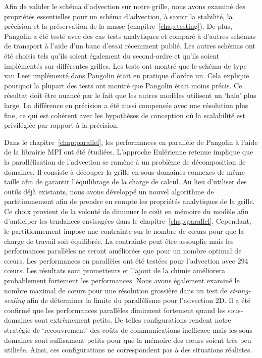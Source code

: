 Afin de valider le schéma d'advection sur notre grille, nous avons examiné des
propriétés essentielles pour un schéma d'advection, à savoir la stabilité, la
précision et la préservation de la masse (chapitre~\ref{chap:testing}). De plus,
Pangolin a été testé avec des cas tests analytiques et comparé à d'autres
schémas de transport à l'aide d'un banc d'essai récemment publié. Les autres
schémas ont été choisis tels qu'ils soient également du second-ordre et qu'ils
soient implémentés sur différentes grilles. Les tests ont montré que le schéma
de type van Leer implémenté dans Pangolin était en pratique d'ordre un. Cela
explique pourquoi la plupart des tests ont montré que Pangolin était moins
précis. Ce résultat doit être nuancé par le fait que les autres modèles
utilisent un `halo' plus large. La différence en précision a été aussi
compensée avec une résolution plus fine, ce qui est cohérent avec les
hypothèses de conception où la scalabilité est privilégiée par rapport à la
précision.

Dans le chapitre~\ref{chap:parallel}, les performances en parallèle de Pangolin
à l'aide de la librairie MPI ont été étudiées. L'approche Eulérienne retenue
implique que la parallélisation de l'advection se ramène à un problème de
décomposition de domaines. Il consiste à découper la grille en sous-domaines
connexes de même taille afin de garantir l'équilibrage de la charge de calcul.
Au lieu d'utiliser des outils déjà existants, nous avons développé un nouvel
algorithme de partitionnement afin de prendre en compte les propriétés
analytiques de la grille. Ce choix provient de la volonté de diminuer le coût en
mémoire du modèle afin d'anticiper les tendances envisagées dans le
chapitre~\ref{chap:parallel}. Cependant, le partitionnement impose une
contrainte sur le nombre de c\oe{}urs pour que la charge de travail soit
équilibrée. La contrainte peut être assouplie mais les performances parallèles
ne seront améliorées que pour un nombre optimal de c\oe{}urs. Les performances en
parallèles ont été testées pour l'advection avec 294 c\oe{}urs. Les résultats sont
prometteurs et l'ajout de la chimie améliorera probablement fortement les
performances. Nous avons également examiné le nombre maximal de c\oe{}urs pour une
résolution grossière dans un test de \textit{strong-scaling} afin de déterminer la
limite du parallélisme pour l'advection 2D. Il a été confirmé que les
performances parallèles diminuent fortement quand les sous-domaines sont
extrêmement petits. De telles configurations rendent notre stratégie de
`recouvrement' des coûts de communications inefficace mais les sous-domaines
sont suffisament petits pour que la mémoire des c\oe{}urs soient très peu
utilisée. Ainsi, ces configurations ne correspondent pas à des situations
réalistes.


